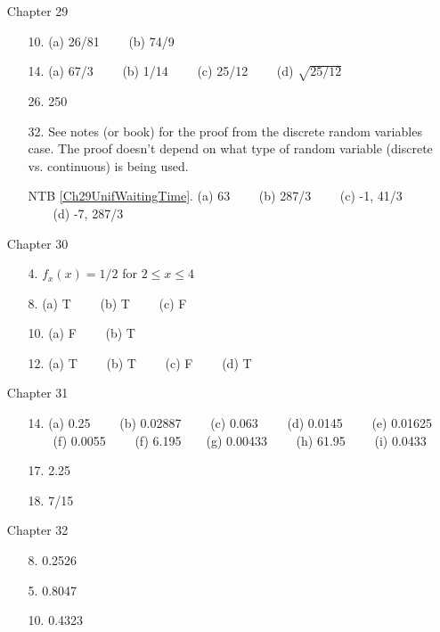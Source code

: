 \documentclass[12pt]{article}
\begin{document}
\begin{itemize}
\item[Chapter 29]         \label{ANS_29}
	\begin{itemize}
	\item[10.] (a)  26/81 \ \ \ \ (b)  74/9
	\item[14.]	(a) 67/3  \ \ \ \ (b) 1/14 \ \ \ \   (c) 25/12  \ \ \ \ (d) $\sqrt{25/12}$
	\item[26.]   250
	\item[32.]  See notes (or book) for the proof from the discrete random variables case. The proof doesn't depend on what type of random variable (discrete vs. continuous) is being used.
	\item[NTB \ref{Ch29UnifWaitingTime}.] (a) 63  \ \ \ \ (b) 287/3  \ \ \ \   (c) -1, 41/3  \ \ \ \ (d) -7, 287/3	
	\end{itemize}

\item[Chapter 30]         \label{ANS_30}
	\begin{itemize}
	\item[4.] $f_x(x)=1/2$ for $2\leq x\leq 4$
	\item[8.] (a) T  \ \ \ \ (b) T \ \ \ \   (c)  F
	\item[10.]	(a) F  \ \ \ \ (b)  T   
	\item[12.]  (a) T  \ \ \ \ (b) T \ \ \ \   (c) F  \ \ \ \ (d) T
	\end{itemize}

\item[Chapter 31]         \label{ANS_31}
	\begin{itemize}
	\item[14.]  (a) 0.25  \ \ \ \ (b) 0.02887 \ \ \ \   (c)  0.063 \ \ \ \ (d) 0.0145 \ \ \ \  (e) 0.01625  \ \ \ \ (f)  0.0055    \ \ \ \ (f)  6.195\ \ \ \   (g) 0.00433  \ \ \ \ (h) 61.95 \ \ \ \   (i) 0.0433
	\item[17.] 2.25
	\item[18.] 7/15
	\end{itemize}

\item[Chapter 32]         \label{ANS_32}
	\begin{itemize}
	\item[8.] 0.2526
	\item[5.] 0.8047
	\item[10.] 0.4323
	\end{itemize}


\end{itemize}
\end{document}
